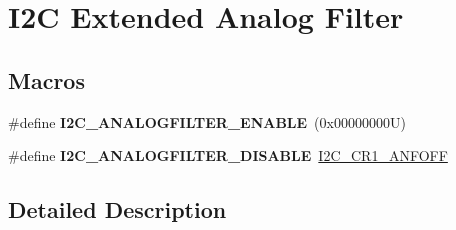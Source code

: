 \hypertarget{group___i2_c_ex___analog___filter}{}\section{I2C Extended Analog Filter}
\label{group___i2_c_ex___analog___filter}
\subsection*{Macros}
\begin{DoxyCompactItemize}
\item 
\mbox{\label{group___i2_c_ex___analog___filter_gae13bf4e7efd918ab0d13d04472d12069}} 
\#define {\bfseries I2\+C\+\_\+\+A\+N\+A\+L\+O\+G\+F\+I\+L\+T\+E\+R\+\_\+\+E\+N\+A\+B\+LE}~(0x00000000\+U)
\item 
\mbox{\label{group___i2_c_ex___analog___filter_gaa6abec6bc8906cae55371c8e953353b8}} 
\#define {\bfseries I2\+C\+\_\+\+A\+N\+A\+L\+O\+G\+F\+I\+L\+T\+E\+R\+\_\+\+D\+I\+S\+A\+B\+LE}~\hyperlink{group___peripheral___registers___bits___definition_ga4b33b8e33fa18fd49d6d1d8a69777289}{I2\+C\+\_\+\+C\+R1\+\_\+\+A\+N\+F\+O\+FF}
\end{DoxyCompactItemize}


\subsection{Detailed Description}
